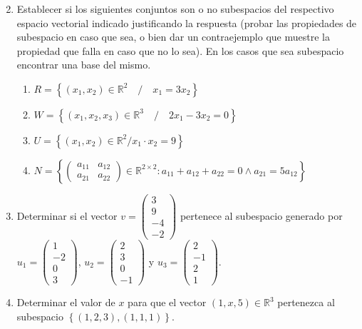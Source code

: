 \documentclass[12pt,letterpaper]{article}
\begin{document}
\begin{enumerate}
\begin{multicols}{2}
  \end{multicols}
  \item Establecer si los siguientes conjuntos son o no subespacios del respectivo espacio vectorial indicado justificando la respuesta (probar las propiedades de subespacio en caso que sea, o bien dar un contraejemplo que muestre la propiedad que falla en caso que no lo sea). En los casos que sea subespacio encontrar una base del mismo.
    \begin{enumerate}
      \item $R = \left\{(x_1,x_2) \in \mathbb{R}^2\quad /\quad x_1 = 3x_2\right\}$
      \item $W = \left\{(x_1,x_2,x_3) \in \mathbb{R}^3\quad /\quad 2x_1 - 3x_2 = 0\right\}$
      \item $U = \left\{(x_1,x_2) \in \mathbb{R}^2 / x_1\cdot x_2 = 9\right\}$
      \item $N=\left\{\begin{pmatrix}
      a_{11} & a_{12}\\
      a_{21} & a_{22}
    \end{pmatrix} \in \mathbb{R}^{2\times2}:a_{11}+a_{12}+a_{22}=0 \wedge a_{21}=5a_{12}\right\}$
    \end{enumerate}            
  \item Determinar si el vector $v=\begin{pmatrix}
  3\\
  9\\
  -4\\
  -2
  \end{pmatrix}$ pertenece al subespacio generado por $u_1=\begin{pmatrix}
  1\\
  -2\\
  0\\
  3\end{pmatrix}$, $u_2 = \begin{pmatrix}
    2\\
    3\\
    0\\
    -1
  \end{pmatrix}$ y $u_3 = \begin{pmatrix}
    2\\
    -1\\
    2\\
    1
  \end{pmatrix}$.
  \item Determinar el valor de $x$ para que el vector $(1, x, 5) \in \mathbb{R}^3$ pertenezca al subespacio $\left\{(1, 2, 3), (1, 1, 1)\right\}$.

\end{enumerate}
\end{document}
